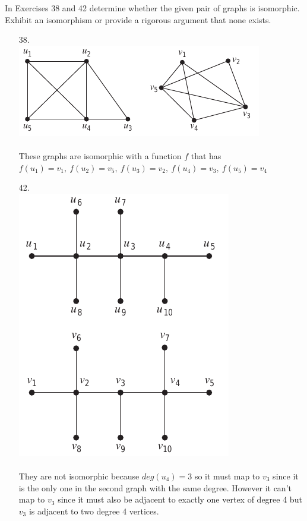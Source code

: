 In Exercises 38 and 42 determine whether the given pair of graphs
is isomorphic. Exhibit an isomorphism or provide a rigorous
argument that none exists.
\begin{itemize}
      \item[38.]\text{}\\
            \includegraphics[]{img/10_3_38_graph.png} \\
            \answer \\
            These graphs are isomorphic with a function $f$ that has $f(u_1) = v_1,\ f(u_2) =v_5,\
                  f(u_3) = v_2,\ f(u_4) = v_3,\ f(u_5) = v_4$
      \item[42.]\text{}\\
            \includegraphics[scale = 0.7]{img/10_3_42_graph.png} \\
            \answer \\
            They are not isomorphic because $deg(u_4) =3$ so it must map to $v_3$ since it is the only one in the second graph with
            the same degree. However it can't map to $v_3$ since it must also be adjacent to
            exactly one vertex of degree 4 but $v_3$ is adjacent to two degree 4 vertices.

\end{itemize}

